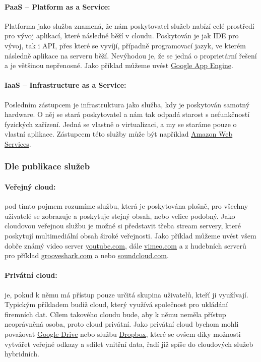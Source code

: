 \paragraph{PaaS -- Platform as a Service:}
Platforma jako služba znamená, že nám poskytovatel služeb nabízí celé prostředí pro vývoj aplikací, které následně běží v cloudu. Poskytován je jak IDE pro vývoj, tak i API, přes které se vyvíjí, případně programovací jazyk, ve kterém následně aplikace na serveru běží. Nevýhodou je, že se jedná o proprietární řešení a je většinou nepřenosné. Jako příklad můžeme uvést \href{appengine.google.com}{Google App Engine}.

\paragraph{IaaS -- Infrastructure as a Service:}
Posledním zástupcem je infrastruktura jako služba, kdy je poskytován samotný hardware. O něj se stará poskytovatel a nám tak odpadá starost s nefunkčností fyzických zařízení. Jedná se vlastně o virtualizaci, a my se staráme pouze o vlastní aplikace. Zástupcem této služby může být například \href{http://aws.amazon.com/}{Amazon Web Services}.

\subsubsection{Dle publikace služeb}

\paragraph{Veřejný cloud:} pod tímto pojmem rozumíme službu, která je poskytována plošně, pro všechny uživatelé se zobrazuje a poskytuje stejný obsah, nebo velice podobný. Jako cloudovou veřejnou službu je možné si představit třeba stream servery, které poskytují multimediální obsah široké veřejnosti. Jako příklad můžeme uvést všem dobře známý video server  \href{http://youtube.com}{youtube.com}, dále \href{http://vimeo.com}{vimeo.com} a z hudebních serverů pro příklad \href{http://grooveshark.com}{grooveshark.com} a nebo \href{http://soundcloud.com}{soundcloud.com}.

\paragraph{Privátní cloud:} je, pokud k němu má přístup pouze určitá skupina uživatelů, kteří ji využívají. Typickým příkladem budiž cloud, který využívá společnost pro ukládání firemních dat. Cílem takového cloudu bude, aby k němu neměla přístup neoprávněná osoba, proto cloud privátní. Jako privátní cloud bychom mohli považovat \href{https://drive.google.com}{Google Drive} nebo službu \href{https://dropbox.com/}{Dropbox}, které se ovšem díky možnosti vytvářet veřejné odkazy a sdílet vnitřní data, řadí již spíše do cloudových služeb hybridních.

